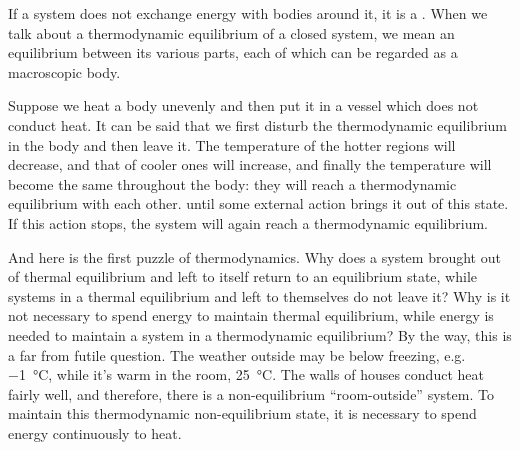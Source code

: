 If a system does not exchange energy with bodies around it, it is a . When we talk about a thermodynamic equilibrium of a closed system, we mean an equilibrium between its various parts, each of which can be regarded as a macroscopic body.

Suppose we heat a body unevenly and then put it in a vessel which does not conduct heat. It can be said that we first disturb the thermodynamic equilibrium in the body and then leave it. The temperature of the hotter regions will decrease, and that of cooler ones will increase, and finally the temperature will become the same throughout the body: they will reach a thermodynamic equilibrium with each other.  until some external action brings it out of this state. If this action stops, the system will again reach a thermodynamic equilibrium.


And here is the first puzzle of thermodynamics. Why does a system brought out of thermal equilibrium and left to itself return to an equilibrium state, while systems in a thermal equilibrium and left to themselves do not leave it? Why is it not necessary to spend energy to maintain thermal equilibrium, while energy is needed to maintain a system in a thermodynamic equilibrium? By the way, this is a far from futile question. The weather outside may be below freezing, e.g. \SI{-1}{\degreeCelsius}, while it's warm in the room, \SI{+25}{\degreeCelsius}. The walls of houses conduct heat fairly well, and therefore, there is a non-equilibrium ``room-outside'' system. To maintain this thermodynamic non-equilibrium state, it is necessary to spend energy continuously to heat.

